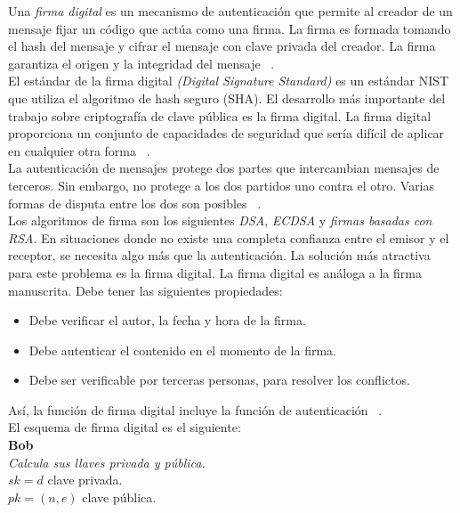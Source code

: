 Una \textit{firma digital} es un mecanismo de autenticación que permite al creador de un mensaje fijar un código que actúa como una firma. La firma es formada tomando el hash del mensaje y cifrar el mensaje con clave privada del creador. La firma garantiza el origen y la integridad del mensaje ~\cite{modes}. \\
El estándar de la firma digital \textit{(Digital Signature Standard)} es un estándar NIST que utiliza el algoritmo de hash seguro (SHA). El desarrollo más importante del trabajo sobre criptografía de clave pública es la firma digital. La firma digital proporciona un conjunto de capacidades de seguridad que sería difícil de aplicar en cualquier otra forma ~\cite{modes}. \\
La autenticación de mensajes protege dos partes que intercambian mensajes de terceros. Sin embargo, no protege a los dos partidos uno contra el otro. Varias formas de disputa entre los dos son posibles ~\cite{modes}. \\
Los algoritmos de firma son los siguientes \textit{DSA}, \textit{ECDSA} y \textit{firmas basadas con RSA}.
En situaciones donde no existe una completa confianza entre el emisor y el receptor, se necesita algo más que la autenticación. La solución más atractiva para este problema es la firma digital. La firma digital es análoga a la firma manuscrita. Debe tener las siguientes propiedades:

	\begin{itemize}
		\item Debe verificar el autor, la fecha y hora de la firma.
		\item Debe autenticar el contenido en el momento de la firma.
		\item Debe ser verificable por terceras personas, para resolver los conflictos.
	\end{itemize}

Así, la función de firma digital incluye la función de autenticación ~\cite{modes}.\\

El esquema de firma digital es el siguiente:\\


\textbf{Bob}\\
\textit{Calcula sus llaves privada y pública.} \\

\textit{$ sk = d $} clave privada.\\

\textit{$ pk = (n, e) $} clave pública. \\


